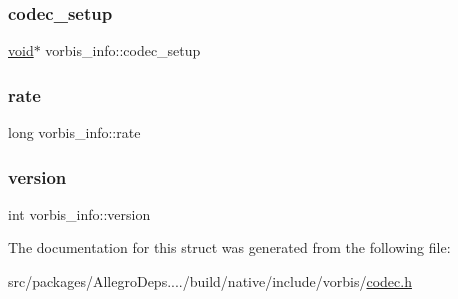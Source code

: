 \subsubsection{\texorpdfstring{codec\+\_\+setup}{codec\_setup}}
{\footnotesize\ttfamily \hyperlink{png_8h_ac9c84fa68bbad002983e35ce3663c686}{void}$\ast$ vorbis\+\_\+info\+::codec\+\_\+setup}

\mbox{\label{structvorbis__info_a01879ed23ecd9605cf6779ef2663a681}} 
\subsubsection{\texorpdfstring{rate}{rate}}
{\footnotesize\ttfamily long vorbis\+\_\+info\+::rate}

\mbox{\label{structvorbis__info_a2d832259b1e3fbf4d1cd619ab5743612}} 
\subsubsection{\texorpdfstring{version}{version}}
{\footnotesize\ttfamily int vorbis\+\_\+info\+::version}



The documentation for this struct was generated from the following file\+:\begin{DoxyCompactItemize}
\item 
src/packages/\+Allegro\+Deps..../build/native/include/vorbis/\hyperlink{vorbis_2codec_8h}{codec.\+h}\end{DoxyCompactItemize}
